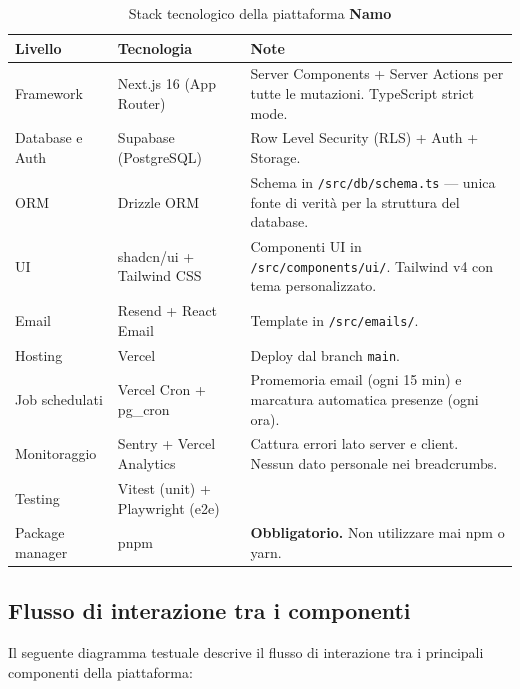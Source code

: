 \documentclass[a4paper,11pt,oneside]{book}
\newcommand{\namo}{\textbf{Namo}}
\begin{document}
\begin{table}[htbp]
\centering
\caption{Stack tecnologico della piattaforma \namo{}}
\label{tab:stack-tecnologico}
\begin{tabularx}{\textwidth}{l l X}
\toprule
\textbf{Livello} & \textbf{Tecnologia} & \textbf{Note} \\
\midrule
Framework         & Next.js 16 (App Router) & Server Components + Server Actions per tutte le mutazioni. TypeScript strict mode. \\
Database e Auth   & Supabase (PostgreSQL)   & Row Level Security (RLS) + Auth + Storage. \\
ORM               & Drizzle ORM             & Schema in \texttt{/src/db/schema.ts} --- unica fonte di verit\`a per la struttura del database. \\
UI                & shadcn/ui + Tailwind CSS & Componenti UI in \texttt{/src/components/ui/}. Tailwind v4 con tema personalizzato. \\
Email             & Resend + React Email    & Template in \texttt{/src/emails/}. \\
Hosting           & Vercel                  & Deploy dal branch \texttt{main}. \\
Job schedulati    & Vercel Cron + pg\_cron  & Promemoria email (ogni 15 min) e marcatura automatica presenze (ogni ora). \\
Monitoraggio      & Sentry + Vercel Analytics & Cattura errori lato server e client. Nessun dato personale nei breadcrumbs. \\
Testing           & Vitest (unit) + Playwright (e2e) & \\
Package manager   & pnpm                    & \textbf{Obbligatorio.} Non utilizzare mai npm o yarn. \\
\bottomrule
\end{tabularx}
\end{table}

\subsection{Flusso di interazione tra i componenti}

Il seguente diagramma testuale descrive il flusso di interazione tra i principali componenti della piattaforma:
\end{document}
